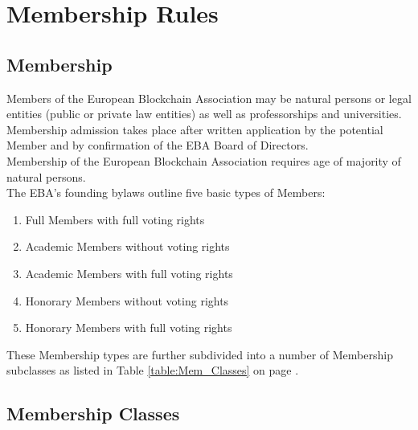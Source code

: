 \documentclass{article}
\begin{document}
\newpage

\section{Membership Rules}

\subsection{Membership}

Members of the European Blockchain Association may be natural persons or legal entities (public or private law entities) as well as professorships and universities. 
Membership admission takes place after written application by the potential Member and by confirmation of the EBA Board of Directors. \\

Membership of the European Blockchain Association requires age of majority of natural persons.\\

The EBA's founding bylaws outline five basic types of Members:

\begin{enumerate}
	\item {Full Members with full voting rights} 
	\item Academic Members without voting rights
	\item Academic Members with full voting rights
	\item Honorary Members without voting rights
	\item Honorary Members with full voting rights
\end{enumerate}

These Membership types are further subdivided into a number of Membership subclasses as listed in Table \ref{table:Mem_Classes} on page \pageref{table:Mem_Classes}.

\subsection{Membership Classes}
\end{document}
